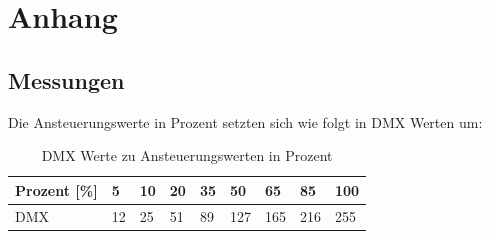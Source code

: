\documentclass[11pt]{scrartcl}
\begin{document}
\renewcommand{\thesubsection}{\Alph{subsection}}
\section*{Anhang}

\subsection{Messungen}
Die Ansteuerungswerte in Prozent setzten sich wie folgt in DMX Werten um:
\begin{table}[H]
    \begin{tabularx}{\textwidth}{|l|X|X|X|X|X|X|X|X|}
        \hline
        Prozent [\%] & 5  & 10 & 20 & 35 & 50  & 65  & 85  & 100\\\hline
        DMX          & 12 & 25 & 51 & 89 & 127 & 165 & 216 & 255\\\hline
    \end{tabularx}
    \caption{DMX Werte zu Ansteuerungswerten in Prozent} \label{table:dmxToPercent}
\end{table}
\vspace{-.5cm}
\end{document}
